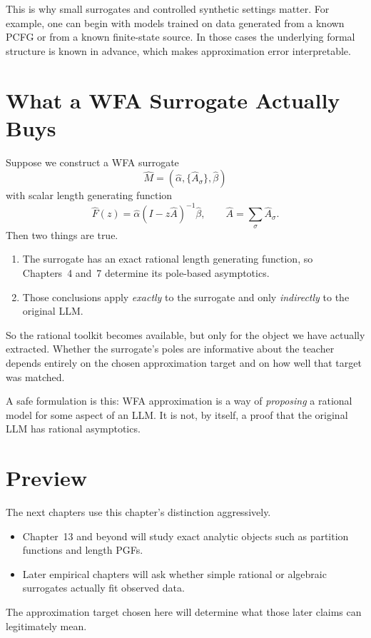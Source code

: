 This is why small surrogates and controlled synthetic settings matter. For example, one can begin with models trained on data generated from a known PCFG or from a known finite-state source. In those cases the underlying formal structure is known in advance, which makes approximation error interpretable.

\section{What a WFA Surrogate Actually Buys}

Suppose we construct a WFA surrogate
\[
  \widehat M = (\hat\alpha, \{\hat A_\sigma\}, \hat\beta)
\]
with scalar length generating function
\[
  \widehat F(z) = \hat\alpha (I-z\hat A)^{-1} \hat\beta,
  \qquad
  \hat A = \sum_\sigma \hat A_\sigma.
\]
Then two things are true.

\begin{enumerate}
  \item The surrogate has an exact rational length generating function, so Chapters~4 and~7 determine its pole-based asymptotics.
  \item Those conclusions apply \emph{exactly} to the surrogate and only \emph{indirectly} to the original LLM.
\end{enumerate}

So the rational toolkit becomes available, but only for the object we have actually extracted. Whether the surrogate's poles are informative about the teacher depends entirely on the chosen approximation target and on how well that target was matched.

A safe formulation is this: WFA approximation is a way of \emph{proposing} a rational model for some aspect of an LLM. It is not, by itself, a proof that the original LLM has rational asymptotics.

\section*{Preview}

The next chapters use this chapter's distinction aggressively.
\begin{itemize}
  \item Chapter~13 and beyond will study exact analytic objects such as partition functions and length PGFs.
  \item Later empirical chapters will ask whether simple rational or algebraic surrogates actually fit observed data.
\end{itemize}
The approximation target chosen here will determine what those later claims can legitimately mean.

